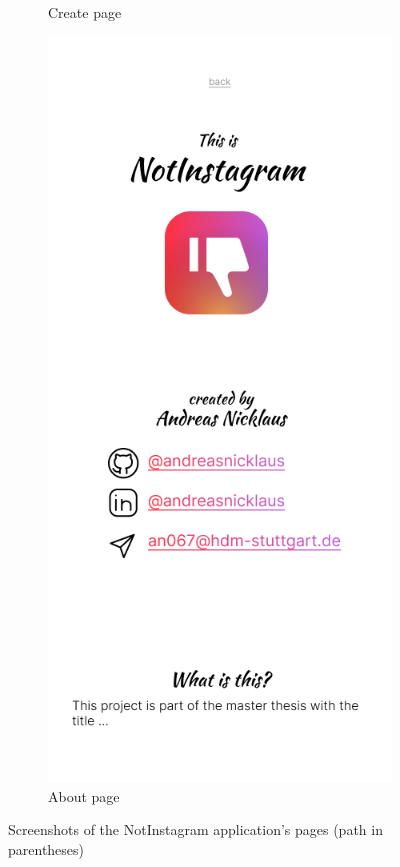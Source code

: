 \documentclass[a4paper, 12pt]{article}
\begin{document}
\begin{figure}[h]
\begin{subfigure}{0.24\linewidth}
\begin{center}
    \end{center}
    \caption{Create page}\label{subfig:create}
  \end{subfigure}
  \begin{subfigure}{0.24\linewidth}
    \begin{center}
      \includegraphics[width=\linewidth, height=0.3\textheight, keepaspectratio,frame]{img/ig-clone/Informationsseite.png}
    \end{center}
    \caption{About page}\label{subfig:about}
  \end{subfigure}
  \caption{Screenshots of the NotInstagram application's pages (path in parentheses)}\label{fig:screenshots}
\end{figure}
\end{document}
